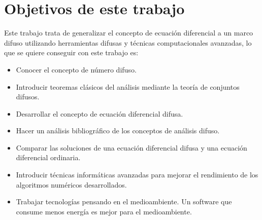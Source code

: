 \section{Objetivos de este trabajo}
Este trabajo trata de generalizar el concepto de ecuación diferencial a un marco difuso utilizando herramientas difusas y técnicas computacionales avanzadas, lo que se quiere conseguir con este trabajo es:
\begin{itemize}
	\item Conocer el concepto de número difuso.
	
	\item Introducir teoremas clásicos del análisis mediante la teoría de conjuntos difusos.
	
	\item Desarrollar el concepto de ecuación diferencial difusa.
	
	\item Hacer un análisis bibliográfico de los conceptos de análisis difuso.
	
	\item Comparar las soluciones de una ecuación diferencial difusa y una ecuación diferencial ordinaria.
	
	\item Introducir técnicas informáticas avanzadas para mejorar el rendimiento de los algoritmos numéricos desarrollados.
	
	\item Trabajar tecnologías pensando en el medioambiente. Un software que consume menos energía es mejor para el medioambiente.
\end{itemize}